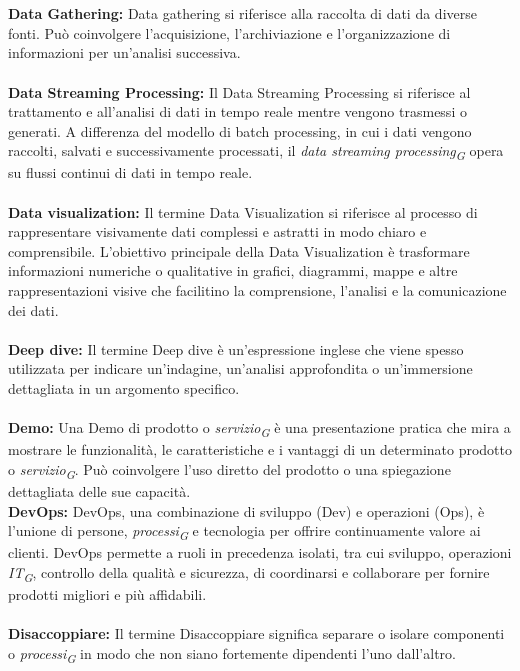 \documentclass{article}
\begin{document}
\\
\\
\textbf{Data Gathering:} Data gathering si riferisce alla raccolta di dati da diverse fonti. Può coinvolgere l'acquisizione, l'archiviazione e l'organizzazione di informazioni per un'analisi successiva.
\\
\\
\textbf{Data Streaming Processing:} Il Data Streaming Processing si riferisce al trattamento e all'analisi di dati in tempo reale mentre vengono trasmessi o generati. A differenza del modello di batch processing, in cui i dati vengono raccolti, salvati e successivamente processati, il \textit{data streaming processing}\textsubscript{\textit{G}} opera su flussi continui di dati in tempo reale.
\\
\\
\textbf{Data visualization:} Il termine Data Visualization si riferisce al processo di rappresentare visivamente dati complessi e astratti in modo chiaro e comprensibile. L'obiettivo principale della Data Visualization è trasformare informazioni numeriche o qualitative in grafici, diagrammi, mappe e altre rappresentazioni visive che facilitino la comprensione, l'analisi e la comunicazione dei dati. 
\\
\\
\textbf{Deep dive:} Il termine Deep dive è un'espressione inglese che viene spesso utilizzata per indicare un'indagine, un'analisi approfondita o un'immersione dettagliata in un argomento specifico.
\\
\\
\textbf{Demo:} Una Demo di prodotto o \textit{servizio}\textsubscript{\textit{G}} è una presentazione pratica che mira a mostrare le funzionalità, le caratteristiche e i vantaggi di un determinato prodotto o \textit{servizio}\textsubscript{\textit{G}}. Può coinvolgere l'uso diretto del prodotto o una spiegazione dettagliata delle sue capacità.
\pagebreak
\\
\textbf{DevOps:} DevOps, una combinazione di sviluppo (Dev) e operazioni (Ops), è l'unione di persone, \textit{processi}\textsubscript{\textit{G}} e tecnologia per offrire continuamente valore ai clienti. DevOps permette a ruoli in precedenza isolati, tra cui sviluppo, operazioni \textit{IT}\textsubscript{\textit{G}}, controllo della qualità e sicurezza, di coordinarsi e collaborare per fornire prodotti migliori e più affidabili.
\\
\\
\textbf{Disaccoppiare:} Il termine Disaccoppiare significa separare o isolare componenti o \textit{processi}\textsubscript{\textit{G}} in modo che non siano fortemente dipendenti l'uno dall'altro.
\end{document}

